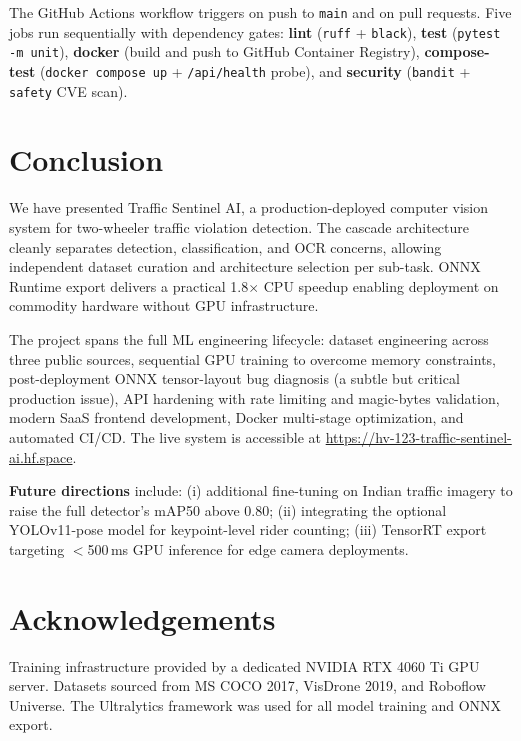 \documentclass[10pt,twocolumn]{article}
\begin{document}
The GitHub Actions workflow triggers on push to \texttt{main} and on
pull requests. Five jobs run sequentially with dependency gates:
\textbf{lint} (\texttt{ruff} + \texttt{black}),
\textbf{test} (\texttt{pytest -m unit}),
\textbf{docker} (build and push to GitHub Container Registry),
\textbf{compose-test} (\texttt{docker compose up} + \texttt{/api/health} probe),
and \textbf{security} (\texttt{bandit} + \texttt{safety} CVE scan).

\section{Conclusion}

We have presented Traffic Sentinel AI, a production-deployed computer vision
system for two-wheeler traffic violation detection. The cascade architecture
cleanly separates detection, classification, and OCR concerns, allowing
independent dataset curation and architecture selection per sub-task.
ONNX Runtime export delivers a practical 1.8$\times$ CPU speedup enabling
deployment on commodity hardware without GPU infrastructure.

The project spans the full ML engineering lifecycle: dataset engineering
across three public sources, sequential GPU training to overcome memory
constraints, post-deployment ONNX tensor-layout bug diagnosis (a subtle
but critical production issue), API hardening with rate limiting and
magic-bytes validation, modern SaaS frontend development, Docker multi-stage
optimization, and automated CI/CD. The live system is accessible at
\url{https://hv-123-traffic-sentinel-ai.hf.space}.

\textbf{Future directions} include: (i) additional fine-tuning on Indian
traffic imagery to raise the full detector's mAP50 above 0.80; (ii)
integrating the optional YOLOv11-pose model for keypoint-level rider counting;
(iii) TensorRT export targeting $<$500\,ms GPU inference for edge camera
deployments.

\section*{Acknowledgements}
\small
Training infrastructure provided by a dedicated NVIDIA RTX 4060 Ti GPU server.
Datasets sourced from MS COCO 2017, VisDrone 2019, and Roboflow Universe.
The Ultralytics framework was used for all model training and ONNX export.
\end{document}
